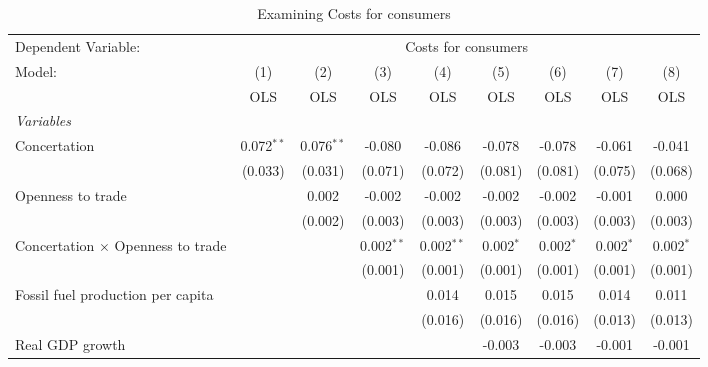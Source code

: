 
\begin{table}[htbp]
   \caption{Examining Costs for consumers}
   \centering
   \begin{tabular}{lcccccccc}
      \toprule
      Dependent Variable: & \multicolumn{8}{c}{Costs for consumers}\\
      Model:                                   & (1)          & (2)          & (3)          & (4)          & (5)         & (6)         & (7)         & (8)\\  
                                               &  OLS         & OLS          & OLS          & OLS          & OLS         & OLS         & OLS         & OLS\\  
      \midrule
      \emph{Variables}\\
      Concertation                             & 0.072$^{**}$ & 0.076$^{**}$ & -0.080       & -0.086       & -0.078      & -0.078      & -0.061      & -0.041\\   
                                               & (0.033)      & (0.031)      & (0.071)      & (0.072)      & (0.081)     & (0.081)     & (0.075)     & (0.068)\\   
      Openness to trade                        &              & 0.002        & -0.002       & -0.002       & -0.002      & -0.002      & -0.001      & 0.000\\   
                                               &              & (0.002)      & (0.003)      & (0.003)      & (0.003)     & (0.003)     & (0.003)     & (0.003)\\   
      Concertation $\times$ Openness to trade  &              &              & 0.002$^{**}$ & 0.002$^{**}$ & 0.002$^{*}$ & 0.002$^{*}$ & 0.002$^{*}$ & 0.002$^{*}$\\   
                                               &              &              & (0.001)      & (0.001)      & (0.001)     & (0.001)     & (0.001)     & (0.001)\\   
      Fossil fuel production per capita        &              &              &              & 0.014        & 0.015       & 0.015       & 0.014       & 0.011\\   
                                               &              &              &              & (0.016)      & (0.016)     & (0.016)     & (0.013)     & (0.013)\\   
      Real GDP growth                          &              &              &              &              & -0.003      & -0.003      & -0.001      & -0.001\\   

\end{tabular}
\end{table}
